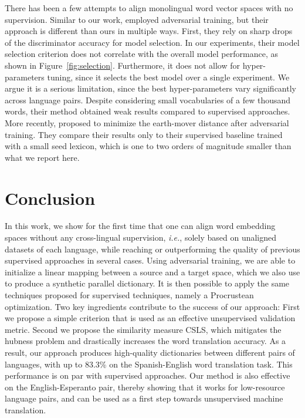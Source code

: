 \documentclass{article} \usepackage{iclr2018_conference,times}
\newcommand{\ie}{\textit{i.e.},\xspace}
\newcommand{\hub}{CSLS\xspace}
\begin{document}
There has been a few attempts to align monolingual word vector spaces with no supervision. Similar to our work, \citet{zhangadversarial} employed adversarial training, but their approach is different than ours in multiple ways. First, they rely on sharp drops of the discriminator accuracy for model selection. In our experiments, their model selection criterion does not correlate with the overall model performance, as shown in Figure~\ref{fig:selection}. Furthermore, it does not allow for hyper-parameters tuning, since it selects the best model over a single experiment. We argue it is a serious limitation, since the best hyper-parameters vary significantly across language pairs. Despite considering small vocabularies of a few thousand words, their method obtained weak results compared to supervised approaches. More recently, \citet{zhang2017earthmover} proposed to minimize the earth-mover distance after adversarial training. They compare their results only to their supervised baseline trained with a small seed lexicon, which is one to two orders of magnitude smaller than what we report here.  \section{Conclusion}
In this work, we show for the first time that one can align word embedding spaces without any cross-lingual supervision, \ie solely based on unaligned datasets of each language, while reaching or outperforming the quality of previous supervised approaches in several cases. Using adversarial training, we are able to initialize a linear mapping between a source and a target space, which we also use to produce a synthetic parallel dictionary. It is then possible to apply the same techniques proposed for supervised techniques, namely a Procrustean optimization. Two key ingredients contribute to the success of our approach: First we propose a simple criterion that is used as an effective unsupervised validation metric. Second we propose the similarity measure \hub, which mitigates the hubness problem and drastically increases the word translation accuracy. As a result, our approach produces high-quality dictionaries between different pairs of languages, with up to 83.3\% on the Spanish-English word translation task. This performance is on par with supervised approaches.
Our method is also effective on the English-Esperanto pair, thereby showing that it works for low-resource language pairs, and can be used as a first step towards unsupervised machine translation.
 
\end{document}
